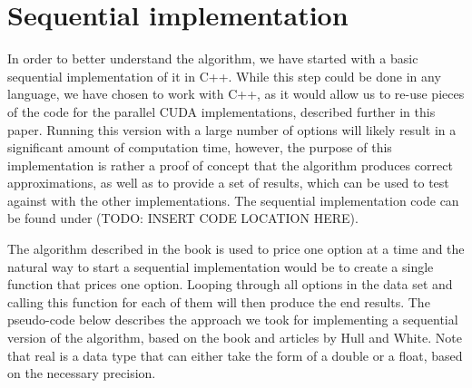 \section{Sequential implementation}
In order to better understand the algorithm, we have started with a basic sequential implementation of it in C++. While this step could be done in any language, we have chosen to work with C++, as it would allow us to re-use pieces of the code for the parallel CUDA implementations, described further in this paper. Running this version with a large number of options will likely result in a significant amount of computation time, however, the purpose of this implementation is rather a proof of concept that the algorithm produces correct approximations, as well as to provide a set of results, which can be used to test against with the other implementations. The sequential implementation code can be found under (TODO: INSERT CODE LOCATION HERE).

The algorithm described in the book is used to price one option at a time and the natural way to start a sequential implementation would be to create a single function that prices one option. Looping through all options in the data set and calling this function for each of them will then produce the end results. The pseudo-code below describes the approach we took for implementing a sequential version of the algorithm, based on the book and articles by Hull and White. Note that real is a data type that can either take the form of a double or a float, based on the necessary precision.

